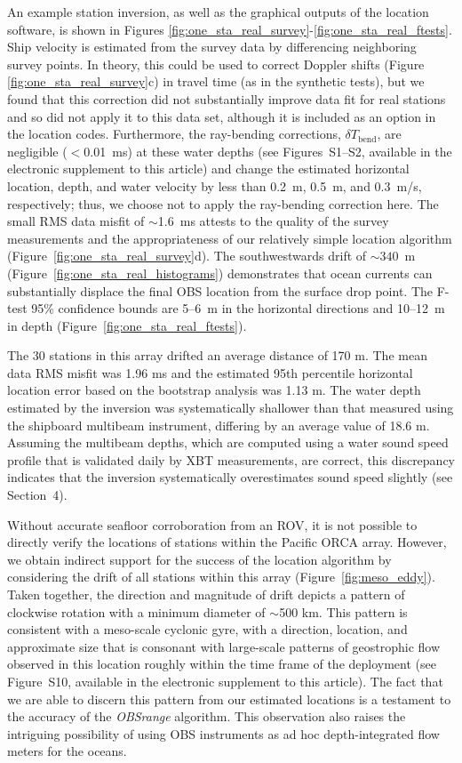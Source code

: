 An example station inversion, as well as the graphical outputs of the location software, is shown in Figures \ref{fig:one_sta_real_survey}-\ref{fig:one_sta_real_ftests}. Ship velocity is estimated from the survey data by differencing neighboring survey points. In theory, this could be used to correct Doppler shifts (Figure \ref{fig:one_sta_real_survey}c) in travel time (as in the synthetic tests), but we found that this correction did not substantially improve data fit for real stations and so did not apply it to this data set, although it is included as an option in the location codes. Furthermore, the ray-bending corrections, $\delta T_{\text{bend}}$, are negligible ($<$0.01~ms) at these water depths (see Figures~S1--S2, available in the electronic supplement to this article) and change the estimated horizontal location, depth, and water velocity by less than 0.2~m, 0.5~m, and 0.3~m/s, respectively; thus, we choose not to apply the ray-bending correction here. The small RMS data misfit of $\sim$1.6~ms attests to the quality of the survey measurements and the appropriateness of our relatively simple location algorithm (Figure~\ref{fig:one_sta_real_survey}d). The southwestwards drift of \mbox{$\sim340$~m} (Figure~\ref{fig:one_sta_real_histograms}) demonstrates that ocean currents can substantially displace the final OBS location from the surface drop point. The F-test 95\% confidence bounds are 5--6~m in the horizontal directions and 10--12~m in depth (Figure~\ref{fig:one_sta_real_ftests}).

The 30 stations in this array drifted an average distance of 170 m. The mean data RMS misfit was 1.96 ms and the estimated 95th percentile horizontal location error based on the bootstrap analysis was 1.13 m. The water depth estimated by the inversion was systematically shallower than that measured using the shipboard multibeam instrument, differing by an average value of 18.6 m. Assuming the multibeam depths, which are computed using a water sound speed profile that is validated daily by XBT measurements, are correct, this discrepancy indicates that the inversion systematically overestimates sound speed slightly (see Section~4). 

Without accurate seafloor corroboration from an ROV, it is not possible to directly verify the locations of stations within the Pacific ORCA array. However, we  obtain indirect support for the success of the location algorithm by considering the drift of all stations within this array (Figure~\ref{fig:meso_eddy}). Taken together, the direction and magnitude of drift depicts a pattern of clockwise rotation with a minimum diameter of $\sim$500 km. This pattern is consistent with a meso-scale cyclonic gyre, with a direction, location, and approximate size that is consonant with large-scale patterns of geostrophic flow observed in this location roughly within the time frame of the deployment (see Figure~S10, available in the electronic supplement to this article). The fact that we are able to discern this pattern from our estimated locations is a testament to the accuracy of the \textit{OBSrange} algorithm. This observation also raises the intriguing possibility of using OBS instruments as ad hoc depth-integrated flow meters for the oceans. 